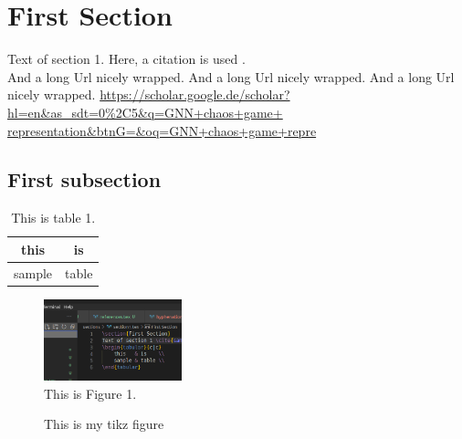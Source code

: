 \section{First Section}

Text of section 1. Here, a citation is used \cite{sample}.\\
And a long Url nicely wrapped. And a long Url nicely wrapped. And a long Url nicely wrapped.
\url{https://scholar.google.de/scholar?hl=en&as_sdt=0\%2C5&q=GNN+chaos+game+
representation&btnG=&oq=GNN+chaos+game+repre}

\subsection{First subsection}

\begin{table}
    \center
    \begin{tabular}{c|c}
        this   & is    \\\hline
        sample & table \\
    \end{tabular}
    \caption{This is table 1.}
\end{table}

\begin{figure}
    \center
    \includegraphics[width=4cm]{fig/images/figure_01.png}
    \caption{This is Figure 1.}
\end{figure}

\begin{figure}
    \center
    
    \caption{This is my tikz figure}
\end{figure}

\newpage